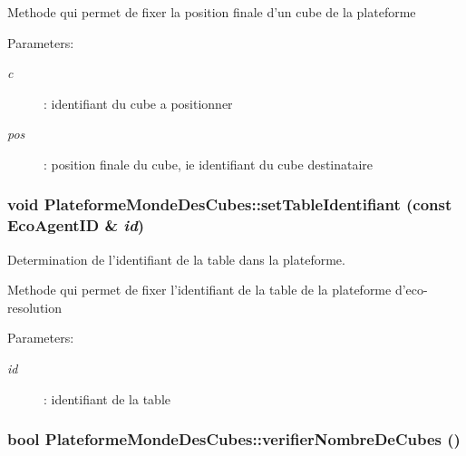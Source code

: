 Methode qui permet de fixer la position finale d'un cube de la plateforme

\begin{Desc}
\item[Parameters:]
\begin{description}
\item[{\em c}]: identifiant du cube a positionner \item[{\em pos}]: position finale du cube, ie identifiant du cube destinataire \end{description}
\end{Desc}
\hypertarget{classPlateformeMondeDesCubes_cf6eccc70251d89c4d12c921f44934af}{
\subsubsection[{setTableIdentifiant}]{\setlength{\rightskip}{0pt plus 5cm}void PlateformeMondeDesCubes::setTableIdentifiant (const {\bf EcoAgentID} \& {\em id})}}
\label{classPlateformeMondeDesCubes_cf6eccc70251d89c4d12c921f44934af}


Determination de l'identifiant de la table dans la plateforme. 

Methode qui permet de fixer l'identifiant de la table de la plateforme d'eco-resolution

\begin{Desc}
\item[Parameters:]
\begin{description}
\item[{\em id}]: identifiant de la table \end{description}
\end{Desc}
\hypertarget{classPlateformeMondeDesCubes_975dd26c6b3703a49498549392976d07}{
\subsubsection[{verifierNombreDeCubes}]{\setlength{\rightskip}{0pt plus 5cm}bool PlateformeMondeDesCubes::verifierNombreDeCubes ()}}
\label{classPlateformeMondeDesCubes_975dd26c6b3703a49498549392976d07}


